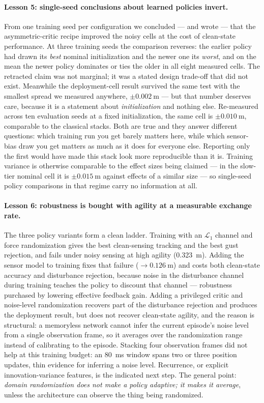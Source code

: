 \paragraph{Lesson 5: single-seed conclusions about learned policies invert.}
From one training seed per configuration we concluded --- and wrote --- that the
asymmetric-critic recipe improved the noisy cells at the cost of clean-state
performance. At three training seeds the comparison reverses: the earlier policy had
drawn its \emph{best} nominal initialization and the newer one its \emph{worst}, and on
the mean the newer policy dominates or ties the older in all eight measured cells. The
retracted claim was not marginal; it was a stated design trade-off that did not exist.
Meanwhile the deployment-cell result survived the same test with the smallest spread we
measured anywhere, $\pm\SI{0.002}{\meter}$ --- but that number deserves care, because it
is a statement about \emph{initialization} and nothing else. Re-measured across ten
evaluation seeds at a fixed initialization, the same cell is $\pm\SI{0.010}{\meter}$,
comparable to the classical stacks. Both are true and they answer different questions:
which training run you get barely matters here, while which sensor-bias draw you get
matters as much as it does for everyone else. Reporting only the first would have made
this stack look more reproducible than it is. Training variance is otherwise comparable
to the effect sizes being claimed --- in the slow-tier nominal cell it is
$\pm\SI{0.015}{\meter}$ against effects of a similar size --- so single-seed policy
comparisons in that regime carry no information at all.

\paragraph{Lesson 6: robustness is bought with agility at a measurable exchange rate.}
The three policy variants form a clean ladder. Training with an $\mathcal{L}_1$ channel
and force randomization gives the best clean-sensing tracking and the best gust
rejection, and fails under noisy sensing at high agility (\SI{0.323}{\meter}). Adding
the sensor model to training fixes that failure ($\rightarrow\SI{0.126}{\meter}$) and
costs both clean-state accuracy and disturbance rejection, because noise in the
disturbance channel during training teaches the policy to discount that channel ---
robustness purchased by lowering effective feedback gain. Adding a privileged critic and
noise-level randomization recovers part of the disturbance rejection and produces the
deployment result, but does not recover clean-state agility, and the reason is
structural: a memoryless network cannot infer the current episode's noise level from a
single observation frame, so it averages over the randomization range instead of
calibrating to the episode. Stacking four observation frames did not help at this
training budget: an \SI{80}{\milli\second} window spans two or three position updates,
thin evidence for inferring a noise level. Recurrence, or explicit innovation-variance
features, is the indicated next step. The general point:
\emph{domain randomization does not make a policy adaptive; it makes it average}, unless
the architecture can observe the thing being randomized.

